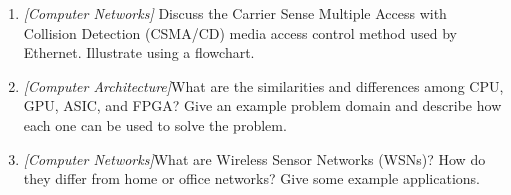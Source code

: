 \documentclass{article}
\begin{document}
\begin{enumerate}
{		\begin{enumerate}
			\item{Most file operations are large streaming reads.}
			\item{Storage uses many inexpensive commodity components that can fail.}
			\item{Writes are mostly append.} 
			\item{Throughput is more important than latency.}
			\item{Can support very large amounts of data.}
		\end{enumerate}
		(Hint: GFS, HDFS)}
		
	\item{\textit{[Computer Networks]} Discuss the Carrier Sense Multiple Access with Collision Detection (CSMA/CD) media access control method used by Ethernet. Illustrate using a flowchart.
		}  	
  	
	\item{\textit{[Computer Architecture]}What are the similarities and differences among CPU, GPU, ASIC, and FPGA? Give an example problem domain and describe how each one can be used to solve the problem.}  	
  	
	\item{\textit{[Computer Networks]}What are Wireless Sensor Networks (WSNs)? How do they differ from home or office networks? Give some example applications.}  	
  	
\end{enumerate}

\begin{thebibliography}{9}

\end{thebibliography}
\end{document}
